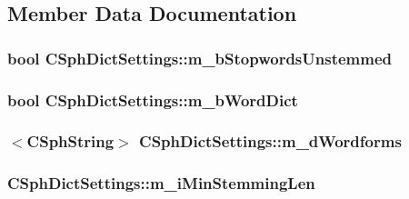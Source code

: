 \subsection{Member Data Documentation}
\hypertarget{structCSphDictSettings_a2c317b69328e84d3a1c9592bfe44bd5b}{
\subsubsection[{m\-\_\-b\-Stopwords\-Unstemmed}]{\setlength{\rightskip}{0pt plus 5cm}bool C\-Sph\-Dict\-Settings\-::m\-\_\-b\-Stopwords\-Unstemmed}}\label{structCSphDictSettings_a2c317b69328e84d3a1c9592bfe44bd5b}
\hypertarget{structCSphDictSettings_a530fa45d260de7b6eeabd5847b4393c6}{
\subsubsection[{m\-\_\-b\-Word\-Dict}]{\setlength{\rightskip}{0pt plus 5cm}bool C\-Sph\-Dict\-Settings\-::m\-\_\-b\-Word\-Dict}}\label{structCSphDictSettings_a530fa45d260de7b6eeabd5847b4393c6}
\hypertarget{structCSphDictSettings_a02d89efdc03ac64e3bd317dd3d6c3999}{
\subsubsection[{m\-\_\-d\-Wordforms}]{$<${\bf C\-Sph\-String}$>$ C\-Sph\-Dict\-Settings\-::m\-\_\-d\-Wordforms}}\label{structCSphDictSettings_a02d89efdc03ac64e3bd317dd3d6c3999}
\hypertarget{structCSphDictSettings_a619f550a2158de2e2f41b0609390c9ac}{
\subsubsection[{m\-\_\-i\-Min\-Stemming\-Len}]{ C\-Sph\-Dict\-Settings\-::m\-\_\-i\-Min\-Stemming\-Len}}\label{structCSphDictSettings_a619f550a2158de2e2f41b0609390c9ac}

